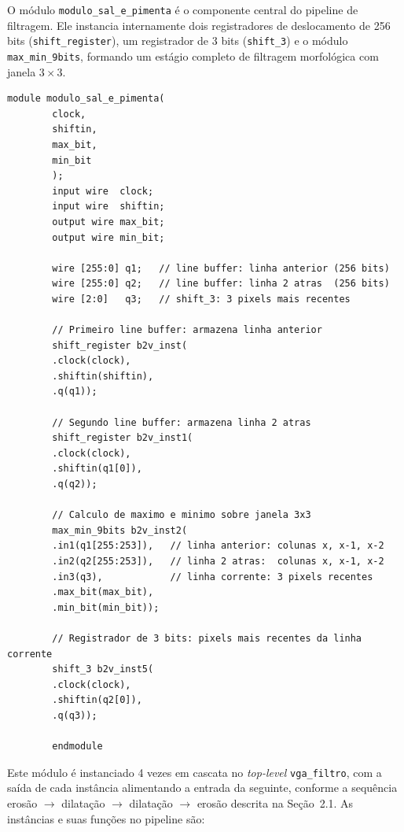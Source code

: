 \documentclass[12pt, a4paper]{article}
\begin{document}
	O módulo \texttt{modulo\_sal\_e\_pimenta} é o componente central do pipeline de
	filtragem. Ele instancia internamente dois registradores de deslocamento de 256
	bits (\texttt{shift\_register}), um registrador de 3 bits (\texttt{shift\_3}) e
	o módulo \texttt{max\_min\_9bits}, formando um estágio completo de filtragem
	morfológica com janela $3\times3$.
	
	\begin{lstlisting}[style=verilog, caption={\texttt{modulo\_sal\_e\_pimenta.v} --- Estágio de pipeline morfológico com line buffers e cálculo de máximo/mínimo.}, label={lst:modulo_sp}]
		module modulo_sal_e_pimenta(
		clock,
		shiftin,
		max_bit,
		min_bit
		);
		input wire  clock;
		input wire  shiftin;
		output wire max_bit;
		output wire min_bit;
		
		wire [255:0] q1;   // line buffer: linha anterior (256 bits)
		wire [255:0] q2;   // line buffer: linha 2 atras  (256 bits)
		wire [2:0]   q3;   // shift_3: 3 pixels mais recentes
		
		// Primeiro line buffer: armazena linha anterior
		shift_register b2v_inst(
		.clock(clock),
		.shiftin(shiftin),
		.q(q1));
		
		// Segundo line buffer: armazena linha 2 atras
		shift_register b2v_inst1(
		.clock(clock),
		.shiftin(q1[0]),
		.q(q2));
		
		// Calculo de maximo e minimo sobre janela 3x3
		max_min_9bits b2v_inst2(
		.in1(q1[255:253]),   // linha anterior: colunas x, x-1, x-2
		.in2(q2[255:253]),   // linha 2 atras:  colunas x, x-1, x-2
		.in3(q3),            // linha corrente: 3 pixels recentes
		.max_bit(max_bit),
		.min_bit(min_bit));
		
		// Registrador de 3 bits: pixels mais recentes da linha corrente
		shift_3 b2v_inst5(
		.clock(clock),
		.shiftin(q2[0]),
		.q(q3));
		
		endmodule
	\end{lstlisting}
	
	Este módulo é instanciado 4 vezes em cascata no \textit{top-level}
	\texttt{vga\_filtro}, com a saída de cada instância alimentando a entrada da
	seguinte, conforme a sequência erosão $\to$ dilatação $\to$ dilatação $\to$ erosão
	descrita na Seção~2.1. As instâncias e suas funções no pipeline são:
	
\end{document}
